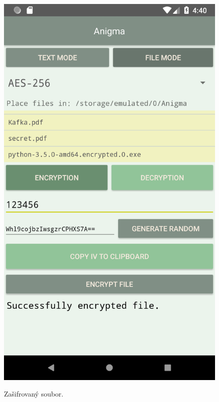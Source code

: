 \documentclass[12pt, a4paper]{article}
\begin{document}
\begin{figure}[h]
\caption{Zašifrovaný soubor.}
\centering
\includegraphics[height=0.4\textheight]{file_enc_success}
\label{fig:file_enc_success}
\end{figure}
\end{document}
